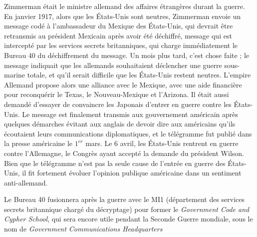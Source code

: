Zimmerman était le ministre allemand des affaires étrangères durant la
guerre. En janvier 1917, alors que les États-Unis sont neutres,
Zimmerman envoie un message codé à l'ambassadeur du Mexique des
États-Unis, qui devrait être retransmis au président Mexicain après
avoir été déchiffré, message qui est intercepté par les services
secrets britanniques, qui charge immédiatement le Bureau 40 du
déchiffrement du message. Un mois plus tard, c'est chose faite ; le
message indiquait que les allemands souhaitaient déclencher une guerre
sous-marine totale, et qu'il serait difficile que les États-Unis
restent neutres. L'empire Allemand propose alors une alliance avec le
Mexique, avec une aide financière pour reconquérir le Texas, le
Nouveau-Mexique et l'Arizona. Il était aussi demandé d'essayer de
convaincre les Japonais d'entrer en guerre contre les États-Unis.
Le message est finalement transmis aux gouvernement américain après
quelques démarches évitant aux anglais de devoir dire aux américains
qu'ils écoutaient leurs communications diplomatiques, et le télégramme
fut publié dans la presse américaine le $1^{er}$ mars. Le 6 avril, les
États-Unis rentrent en guerre contre l'Allemagne, le Congrès ayant
accepté la demande du président Wilson. Bien que le télégramme n'est
pas la seule cause de l'entrée en guerre des États-Unis, il fit
fortement évoluer l'opinion publique américaine dans un sentiment
anti-allemand.

Le Bureau 40 fusionnera après la guerre avec le MI1 (département des
services secrets britannique chargé du décryptage) pour former le
\emph{Government Code and Cypher School}, qui sera encore utile
pendant la Seconde Guerre mondiale, sous le nom de \emph{Government
  Communications Headquarters} \\

